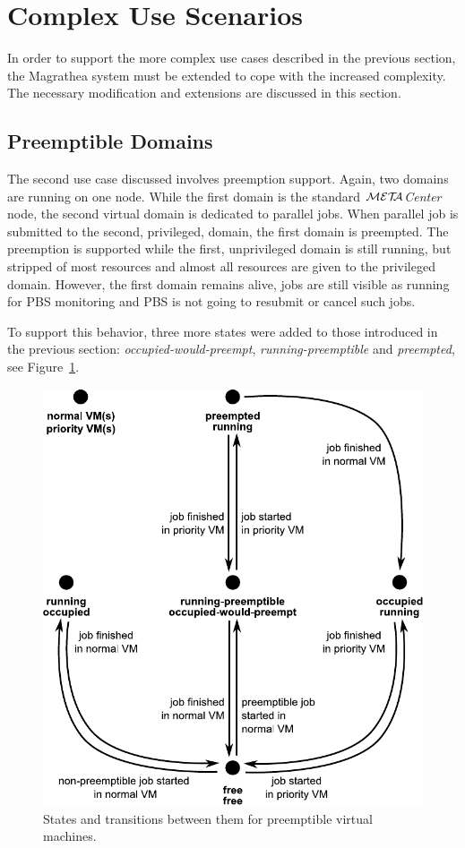 \documentclass[a4paper]{article}
\def\META#1{\textit{${\cal MET\!\!A}$#1}}
\begin{document}
\section{Complex Use Scenarios}

In order to support the more complex use cases described in the previous
section, the Magrathea system must be extended to cope with the increased
complexity. The necessary modification and extensions are discussed in this
section.

\subsection{Preemptible Domains}

The second use case discussed involves preemption support. Again, two domains
are running on one node. While the first domain is the standard \META{Center}
node, the second virtual domain is dedicated to parallel jobs. When parallel
job is submitted to the second, privileged, domain, the first domain is
preempted. The preemption is supported while the first, unprivileged domain is
still running, but stripped of most resources and almost all resources are
given to the privileged domain. However, the first domain remains alive, jobs
are still visible as running for PBS monitoring and PBS is not going to
resubmit or cancel such jobs.

To support this behavior, three more states were added to those introduced in
the previous section: \textit{occupied-would-preempt},
\textit{running-preemptible} and \textit{preempted}, see
Figure~\ref{fig:preemption}.

\begin{figure}[tb]
    \begin{center}
    \includegraphics[width=.6\textwidth]{preemption}
    \end{center}
    \caption{States and transitions between them for preemptible
        virtual machines.}
    \label{fig:preemption}
\end{figure}
\end{document}

